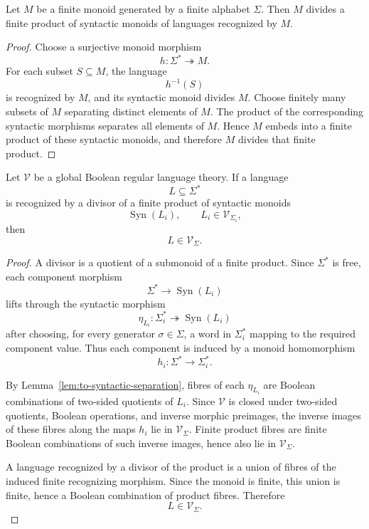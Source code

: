 \begin{lemma}
\label{lem:to-finite-syntactic-generation}
    Let \(M\) be a finite monoid generated by a finite alphabet \(\Sigma\).
    Then \(M\) divides a finite product of syntactic monoids of languages
    recognized by \(M\).
\end{lemma}

\begin{proof}
    Choose a surjective monoid morphism
    \[
        h:\Sigma^*\twoheadrightarrow M.
    \]
    For each subset \(S\subseteq M\), the language
    \[
        h^{-1}(S)
    \]
    is recognized by \(M\), and its syntactic monoid divides \(M\). Choose
    finitely many subsets of \(M\) separating distinct elements of \(M\). The
    product of the corresponding syntactic morphisms separates all elements of
    \(M\). Hence \(M\) embeds into a finite product of these syntactic monoids,
    and therefore \(M\) divides that finite product.
\end{proof}

\begin{lemma}
\label{lem:to-products-of-syntactic-monoids-recognize-variety-languages}
    Let \(\mathcal V\) be a global Boolean regular language theory. If a
    language
    \[
        L\subseteq\Sigma^*
    \]
    is recognized by a divisor of a finite product of syntactic monoids
    \[
        \operatorname{Syn}(L_i),
        \qquad
        L_i\in\mathcal V_{\Sigma_i},
    \]
    then
    \[
        L\in\mathcal V_\Sigma.
    \]
\end{lemma}

\begin{proof}
    A divisor is a quotient of a submonoid of a finite product. Since
    \(\Sigma^*\) is free, each component morphism
    \[
        \Sigma^*\to\operatorname{Syn}(L_i)
    \]
    lifts through the syntactic morphism
    \[
        \eta_{L_i}:\Sigma_i^*\twoheadrightarrow\operatorname{Syn}(L_i)
    \]
    after choosing, for every generator \(\sigma\in\Sigma\), a word in
    \(\Sigma_i^*\) mapping to the required component value. Thus each
    component is induced by a monoid homomorphism
    \[
        h_i:\Sigma^*\to\Sigma_i^*.
    \]

    By Lemma~\ref{lem:to-syntactic-separation}, fibres of each
    \(\eta_{L_i}\) are Boolean combinations of two-sided quotients of \(L_i\).
    Since \(\mathcal V\) is closed under two-sided quotients, Boolean
    operations, and inverse morphic preimages, the inverse images of these
    fibres along the maps \(h_i\) lie in \(\mathcal V_\Sigma\). Finite product
    fibres are finite Boolean combinations of such inverse images, hence also
    lie in \(\mathcal V_\Sigma\).

    A language recognized by a divisor of the product is a union of fibres of
    the induced finite recognizing morphism. Since the monoid is finite, this
    union is finite, hence a Boolean combination of product fibres. Therefore
    \[
        L\in\mathcal V_\Sigma.
    \]
\end{proof}

